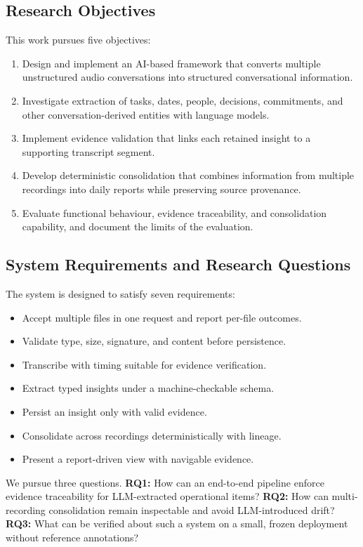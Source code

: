 \documentclass[10pt,a4paper]{article}
\begin{document}
\subsection{Research Objectives}

This work pursues five objectives:
\begin{enumerate}
\item Design and implement an AI-based framework that converts multiple unstructured
audio conversations into structured conversational information.
\item Investigate extraction of tasks, dates, people, decisions, commitments, and other
conversation-derived entities with language models.
\item Implement evidence validation that links each retained insight to a supporting
transcript segment.
\item Develop deterministic consolidation that combines information from multiple
recordings into daily reports while preserving source provenance.
\item Evaluate functional behaviour, evidence traceability, and consolidation capability,
and document the limits of the evaluation.
\end{enumerate}

\subsection{System Requirements and Research Questions}

The system is designed to satisfy seven requirements:
\begin{itemize}
\item[R1] Accept multiple files in one request and report per-file outcomes.
\item[R2] Validate type, size, signature, and content before persistence.
\item[R3] Transcribe with timing suitable for evidence verification.
\item[R4] Extract typed insights under a machine-checkable schema.
\item[R5] Persist an insight only with valid evidence.
\item[R6] Consolidate across recordings deterministically with lineage.
\item[R7] Present a report-driven view with navigable evidence.
\end{itemize}

We pursue three questions. \textbf{RQ1:} How can an end-to-end pipeline enforce
evidence traceability for LLM-extracted operational items? \textbf{RQ2:} How can
multi-recording consolidation remain inspectable and avoid LLM-introduced drift?
\textbf{RQ3:} What can be verified about such a system on a small, frozen deployment
without reference annotations?
\end{document}
